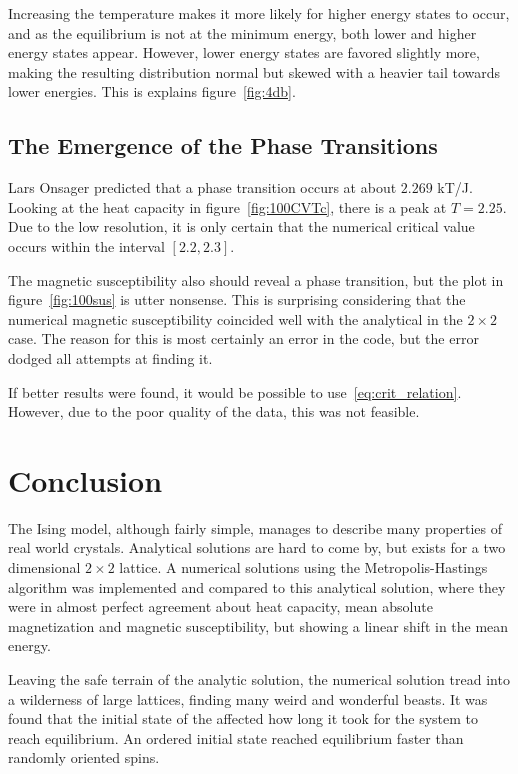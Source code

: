 \documentclass[aps,reprint]{revtex4-1}
\begin{document}
Increasing the temperature makes it more likely for higher energy states to
occur, and as the equilibrium is not at the minimum energy, both lower and
higher energy states appear. However, lower energy states are favored slightly
more, making the resulting distribution normal but skewed with a heavier tail
towards lower energies. This is explains figure~\ref{fig:4db}.

\subsection{The Emergence of the Phase Transitions}
\label{sec:appe-phase-trans-2}

Lars Onsager predicted that a phase transition occurs at about \(2.269\) kT/J.
Looking at the heat capacity in figure~\ref{fig:100CVTc}, there is a peak at
\(T=2.25\). Due to the low resolution, it is only certain that the numerical
critical value occurs within the interval \([2.2, 2.3]\).

The magnetic susceptibility also should reveal a phase transition, but the plot
in figure~\ref{fig:100sus} is utter nonsense. This is surprising
considering that the numerical magnetic susceptibility coincided well with the
analytical in the \(2\times 2\) case. The reason for this is most certainly an
error in the code, but the error dodged all attempts at finding it.

If better results were found, it would be possible to use~\eqref{eq:crit_relation}. However,
due to the poor quality of the data, this was not feasible. 


\section{Conclusion}
\label{sec:conclusion}

The Ising model, although fairly simple, manages to describe many properties of
real world crystals. Analytical solutions are hard to come by, but exists for
a two dimensional \(2\times 2\) lattice. A numerical solutions using the
Metropolis-Hastings algorithm was implemented and compared to this analytical
solution, where they were in almost perfect agreement about heat capacity,
mean absolute magnetization and magnetic susceptibility, but showing a linear shift in the
mean energy.

Leaving the safe terrain of the analytic solution, the numerical solution tread
into a wilderness of large lattices, finding many weird and wonderful beasts. It
was found that the initial state of the affected how long it took for the
system to reach equilibrium. An ordered initial state reached equilibrium
faster than randomly oriented spins.
\end{document}
